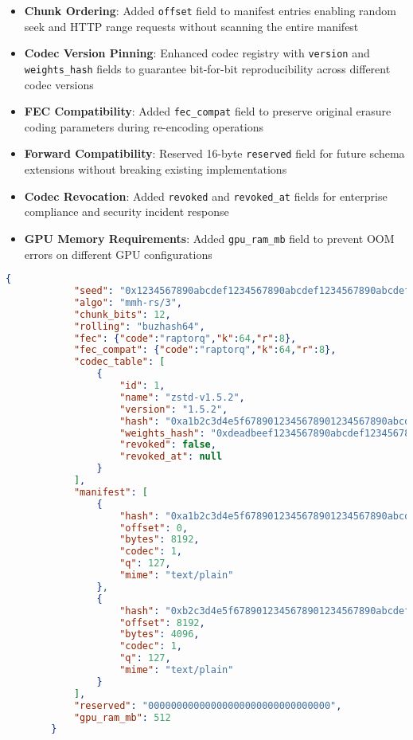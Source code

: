 \documentclass[11pt,a4paper]{article}
\begin{document}
	\begin{itemize}
		\item \textbf{Chunk Ordering}: Added \texttt{offset} field to manifest entries enabling random seek and HTTP range requests without scanning the entire manifest
		\item \textbf{Codec Version Pinning}: Enhanced codec registry with \texttt{version} and \texttt{weights\_hash} fields to guarantee bit-for-bit reproducibility across different codec versions
		\item \textbf{FEC Compatibility}: Added \texttt{fec\_compat} field to preserve original erasure coding parameters during re-encoding operations
		\item \textbf{Forward Compatibility}: Reserved 16-byte \texttt{reserved} field for future schema extensions without breaking existing implementations
		\item \textbf{Codec Revocation}: Added \texttt{revoked} and \texttt{revoked\_at} fields for enterprise compliance and security incident response
		\item \textbf{GPU Memory Requirements}: Added \texttt{gpu\_ram\_mb} field to prevent OOM errors on different GPU configurations
	\end{itemize}
	\begin{lstlisting}[language=json, breaklines=true, basicstyle=\ttfamily\footnotesize, columns=fullflexible, keepspaces=true]
		{
			"seed": "0x1234567890abcdef1234567890abcdef1234567890abcdef1234567890abcdef",
			"algo": "mmh-rs/3",
			"chunk_bits": 12,
			"rolling": "buzhash64",
			"fec": {"code":"raptorq","k":64,"r":8},
			"fec_compat": {"code":"raptorq","k":64,"r":8},
			"codec_table": [
				{
					"id": 1,
					"name": "zstd-v1.5.2",
					"version": "1.5.2",
					"hash": "0xa1b2c3d4e5f6789012345678901234567890abcdef1234567890abcdef12345678",
					"weights_hash": "0xdeadbeef1234567890abcdef1234567890abcdef1234567890abcdef12345678",
					"revoked": false,
					"revoked_at": null
				}
			],
			"manifest": [
				{
					"hash": "0xa1b2c3d4e5f6789012345678901234567890abcdef1234567890abcdef12345678",
					"offset": 0,
					"bytes": 8192,
					"codec": 1,
					"q": 127,
					"mime": "text/plain"
				},
				{
					"hash": "0xb2c3d4e5f6789012345678901234567890abcdef1234567890abcdef1234567890",
					"offset": 8192,
					"bytes": 4096,
					"codec": 1,
					"q": 127,
					"mime": "text/plain"
				}
			],
			"reserved": "00000000000000000000000000000000",
			"gpu_ram_mb": 512
		}
	\end{lstlisting}
	
\end{document}
